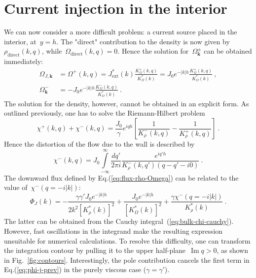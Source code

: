 \documentclass[preprint,aps,eqsecnum]{revtex4-1}
\newcommand{\fplus}[1]{{#1}^{+}}
\newcommand{\fminus}[1]{{#1}^{-}}
\newcommand{\fplusminus}[1]{{#1}^{\pm}}
\renewcommand{\Im}{\mathop{\mathrm{Im}}\nolimits}
\newcommand{\dct}[1]{{#1}_\mathrm{direct}}
\begin{document}
\section{Current injection in the interior}
\label{sec:bulk-src}

We can now consider a more difficult problem: a current source placed
in the interior, at~$y = h$. The "direct" contribution to the density is now given
by~$\dct{\rho}(k, q)$, while~$\dct{\Omega}(k, q) = 0$. Hence the solution
for~$\fplusminus{\Omega}_{\bm k}$ can be obtained immediately:
\begin{align}
\Omega_{J, {\bm k}} &=  \fplus{\Omega}(k, q)
= J_\mathrm{ext}^\ast(k) \frac{\fplus{K}_\Omega(k, q)}{K_\Omega^\ast(k)}
= J_0 e^{-|k|h} \frac{\fplus{K}_\Omega(k, q)}{K_\Omega^\ast(k)}
\ ,
\\
\fminus{\Omega}_{\bm k}
&= - J_0 e^{-|k|h} \frac{\fminus{K}_\Omega(k, q)}{K_\Omega^\ast(k)}
\ .
\end{align}
The solution for the density, however, cannot be obtained in an explicit form.
As outlined previously, one has to solve the Riemann-Hilbert problem
\begin{equation}
  \fplus{\chi}(k, q) + \fminus{\chi}(k, q) = \frac{J_0}{\gamma} e^{iqh}
  \left[\frac{1}{\fminus{K}_\rho(k, q)} -
  \frac{1}{\fplus{K}_\rho(k, q)} \right]
  \ .
\end{equation}
Hence the distortion of the flow due to the wall is described by
\begin{equation}
  \label{eq:bulk-chi-cauchy}
  \fminus{\chi}(k, q) = J_0 \int\limits_{-\infty}^{\infty}
  \frac{dq'}{2\pi i} \frac{e^{iq'h}}{\fminus{K}_\rho(k, q') (q - q' - i0)}
  \ .
\end{equation}
The downward flux defined by Eq.(\ref{eq:flux-rho-Omega}) can be related
to the value of~$\fminus{\chi}(q = -i|k|)$:
\begin{equation}
  \label{eq:phi-j-prev}
\Phi_J(k) = - \frac{\gamma \gamma' J_0 e^{-|k|h}}{2k^2 \left[K_\rho^\ast(k)\right]^2}
+ \frac{J_0 e^{-|k|h}}{\left[K_\Omega^\ast(k)\right]^2}
+ \frac{\gamma \fminus{\chi}(q=-i|k|)}{K_\rho^\ast(k)}
\ .
\end{equation}
The latter can be obtained from the Cauchy integral~(\ref{eq:bulk-chi-cauchy}).
However, fast oscillations in the integrand make the resulting expression
unsuitable for numerical calculations. To resolve this difficulty, one can
transform the integration contour by pulling it to
the upper half-plane~$\Im q > 0$, as shown in Fig.~\ref{fig:contours}.
Interestingly, the pole contribution cancels the first term in Eq.(\ref{eq:phi-j-prev}) in the purely viscous case ($\gamma = \gamma'$).
\end{document}
